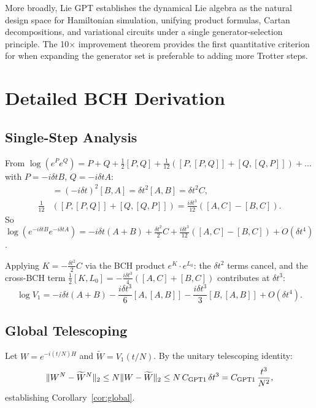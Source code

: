 \documentclass[aps,prxquantum,twocolumn,nofootinbib]{revtex4-2}
\begin{document}
More broadly, Lie GPT establishes the dynamical Lie algebra as the
natural design space for Hamiltonian simulation, unifying product
formulas, Cartan decompositions, and variational circuits under a
single generator-selection principle. The 10$\times$ improvement
theorem provides the first quantitative criterion for when expanding
the generator set is preferable to adding more Trotter steps.




\clearpage
\appendix

\section{Detailed BCH Derivation}
\label{app:derivation}

\subsection{Single-Step Analysis}

From $\log(e^P e^Q) = P+Q+\frac{1}{2}[P,Q]+\frac{1}{12}([P,[P,Q]]+[Q,[Q,P]])+\ldots$
with $P=-i\delta t B$, $Q=-i\delta t A$:
\begin{align}
  [P,Q] &= (-i\delta t)^2[B,A] = \delta t^2[A,B] = \delta t^2 C, \\
  \frac{1}{12}&([P,[P,Q]]+[Q,[Q,P]])
  = \frac{i\delta t^3}{12}([A,C]-[B,C]).
\end{align}
So $\log(e^{-i\delta t B}e^{-i\delta t A})
  = -i\delta t(A+B)+\frac{\delta t^2}{2}C
  +\frac{i\delta t^3}{12}([A,C]-[B,C])+O(\delta t^4)$.

Applying $K=-\frac{\delta t^2}{2}C$ via the BCH product
$e^K\cdot e^{L_0}$: the $\delta t^2$ terms cancel, and the
cross-BCH term $\frac{1}{2}[K,L_0] = -\frac{i\delta t^3}{4}([A,C]+[B,C])$
contributes at $\delta t^3$:
\begin{equation}
  \log V_1
  = -i\delta t(A+B)
  - \frac{i\delta t^3}{6}[A,[A,B]]
  - \frac{i\delta t^3}{3}[B,[A,B]]
  + O(\delta t^4).
\end{equation}

\subsection{Global Telescoping}

Let $W=e^{-i(t/N)H}$ and $\widetilde{W}=V_1(t/N)$. By the
unitary telescoping identity:
\begin{equation}
  \|W^N - \widetilde{W}^N\|_2 \leq N\|W-\widetilde{W}\|_2
  \leq N\,C_{\rm GPT1}\,\delta t^3
  = C_{\rm GPT1}\,\frac{t^3}{N^2},
\end{equation}
establishing Corollary~\ref{cor:global}.
\end{document}
